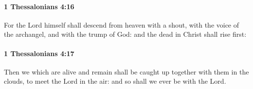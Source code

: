 		\paragraph{1 Thessalonians 4:16} %
			\label{1THESSALONIANS-4-16}

			For the Lord himself shall descend from heaven with a shout, with the voice of the archangel, and with the trump of God: and the dead in Christ shall rise first:

			\begin{framed}
			\scriptsize
				\begin{compactdesc}
					\item[SBLG] 
				\end{compactdesc}
			\end{framed}

		\paragraph{1 Thessalonians 4:17} %
			\label{1THESSALONIANS-4-17}

			Then we which are alive and remain shall be caught up together with them in the clouds, to meet the Lord in the air: and so shall we ever be with the Lord.

